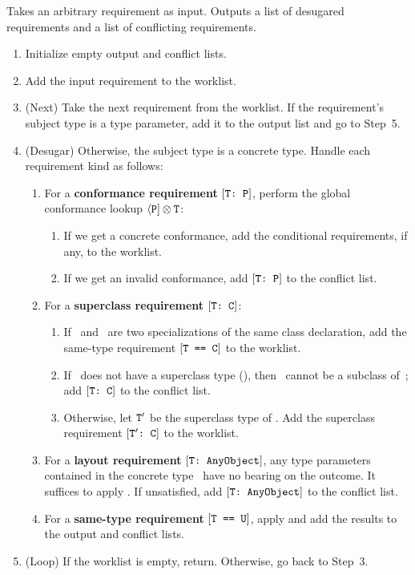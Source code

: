 \documentclass[../generics]{subfiles}
\begin{document}
\begin{algorithm}\label{requirement desugaring algorithm}
Takes an arbitrary requirement as input. Outputs a list of desugared requirements and a list of conflicting requirements.
\begin{enumerate}
\item Initialize empty output and conflict lists.
\item Add the input requirement to the worklist.
\item (Next) Take the next requirement from the worklist. If the requirement's subject type is a type parameter, add it to the output list and go to Step~5.
\item (Desugar) Otherwise, the subject type is a concrete type. Handle each requirement kind as follows:
\begin{enumerate}
\item For a \textbf{conformance requirement} $[\texttt{T:~P}]$, perform the global conformance lookup $\langle\texttt{P}]\otimes\texttt{T}$:
\begin{enumerate}
\item If we get a concrete conformance, add the conditional requirements, if any, to the worklist.
\item If we get an invalid conformance, add $[\texttt{T:~P}]$ to the conflict list.
\end{enumerate}
\item For a \textbf{superclass requirement} $[\texttt{T:~C}]$:
\begin{enumerate}
\item If \tT\ and \tC\ are two specializations of the same class declaration, add the same-type requirement $[\texttt{T == C}]$ to the worklist.
\item If \tT\ does not have a superclass type (), then \tT\ cannot be a subclass of~\tC; add $[\texttt{T:~C}]$ to the conflict list.
\item Otherwise, let $\texttt{T}^\prime$ be the superclass type of \tT. Add the superclass requirement $[\texttt{$\texttt{T}^\prime$:~C}]$ to the worklist.
\end{enumerate}
\item For a \textbf{layout requirement} $[\texttt{T:~AnyObject}]$, any type parameters contained in the concrete type \tT\ have no bearing on the outcome. It suffices to apply . If unsatisfied, add $[\texttt{T:~AnyObject}]$ to the conflict list.
\item For a \textbf{same-type requirement} $[\texttt{T == U}]$, apply  and add the results to the output and conflict lists.
\end{enumerate}
\item (Loop) If the worklist is empty, return. Otherwise, go back to Step~3.
\end{enumerate}
\end{algorithm}
\end{document}
